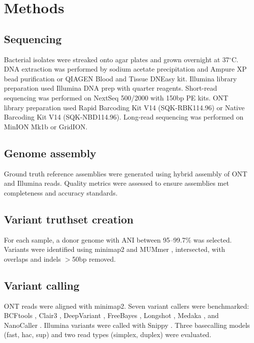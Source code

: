 \documentclass[11pt]{article}
\begin{document}
\section{Methods}

\subsection{Sequencing}

Bacterial isolates were streaked onto agar plates and grown overnight at 37$^\circ$C. DNA extraction was performed by sodium acetate precipitation and Ampure XP bead purification or QIAGEN Blood and Tissue DNEasy kit. Illumina library preparation used Illumina DNA prep with quarter reagents. Short-read sequencing was performed on NextSeq 500/2000 with 150bp PE kits. ONT library preparation used Rapid Barcoding Kit V14 (SQK-RBK114.96) or Native Barcoding Kit V14 (SQK-NBD114.96). Long-read sequencing was performed on MinION Mk1b or GridION.

\subsection{Genome assembly}

Ground truth reference assemblies were generated using hybrid assembly of ONT and Illumina reads. Quality metrics were assessed to ensure assemblies met completeness and accuracy standards.

\subsection{Variant truthset creation}

For each sample, a donor genome with ANI between 95--99.7\% was selected. Variants were identified using minimap2 \citep{li2018minimap2} and MUMmer \citep{marcais2018}, intersected, with overlaps and indels $>$50bp removed.

\subsection{Variant calling}

ONT reads were aligned with minimap2. Seven variant callers were benchmarked: BCFtools \citep{danecek2021}, Clair3 \citep{zheng2022}, DeepVariant \citep{poplin2018}, FreeBayes \citep{garrison2012}, Longshot \citep{edge2019}, Medaka \citep{medaka2023}, and NanoCaller \citep{ahsan2021}. Illumina variants were called with Snippy \citep{seemann2015}. Three basecalling models (fast, hac, sup) and two read types (simplex, duplex) were evaluated.
\end{document}
